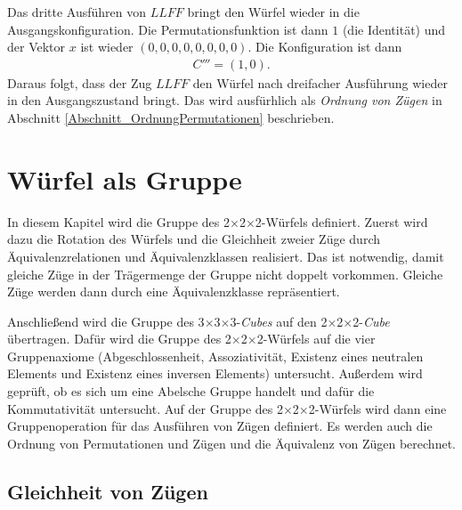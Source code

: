 \documentclass[12pt,a4paper, usenames, dvipsnames]{article}
\theoremstyle{mystyle}
\theoremstyle{definition}
\newcommand{\Ttwo}{2$\times$2$\times$2-}
\newcommand{\Tthree}{3$\times$3$\times$3-}
\begin{document}
Das dritte Ausführen von $LLFF$ bringt den Würfel wieder in die Ausgangskonfiguration. Die Permutationsfunktion ist dann $1$ (die Identität) und der Vektor $x$ ist wieder $(0,0,0,0,0,0,0,0)$. Die Konfiguration ist dann
\begin{align*}
C''' = (1,0).
\end{align*}
Daraus folgt, dass der Zug $LLFF$ den Würfel nach dreifacher Ausführung wieder in den Ausgangszustand bringt. Das wird ausfürhlich als \textit{Ordnung von Zügen} in Abschnitt \ref{Abschnitt_OrdnungPermutationen} beschrieben.

%
%
%
%
%
%
%
%
%
%
%
%
%
%

\newpage
\section{Würfel als Gruppe}

\label{Kapitel_WürfelAlsGruppe}

In diesem Kapitel wird die Gruppe des \Ttwo Würfels definiert. Zuerst wird dazu die Rotation des Würfels und die Gleichheit zweier Züge durch Äquivalenz\-relationen und Äquivalenzklassen realisiert. Das ist notwendig, damit gleiche Züge in der Trägermenge der Gruppe nicht doppelt vorkommen. Gleiche Züge werden dann durch eine Äquivalenzklasse repräsentiert. 

Anschließend wird die Gruppe des \Tthree \textit{Cubes} \cite{JC} auf den \Ttwo \textit{Cube} übertragen. 
Dafür wird die Gruppe des \Ttwo Würfels auf die vier Gruppenaxiome (Abgeschlossenheit, Assoziativität, Existenz eines neutralen Elements und Existenz eines inversen Elements) untersucht. Außerdem wird geprüft, ob es sich um eine Abelsche Gruppe handelt und dafür die Kommutativität untersucht. Auf der Gruppe des \Ttwo Würfels wird dann eine Gruppenoperation für das Ausführen von Zügen definiert. Es werden auch die Ordnung von Permutationen und Zügen und die Äquivalenz von Zügen berechnet.



%
%
%
%
%
%
%
%
%
%
%
%
%
%
%
%
%
%
%

\subsection{Gleichheit von Zügen} 

\label{Abschnitt_GleichheitVonZügen}
\end{document}
